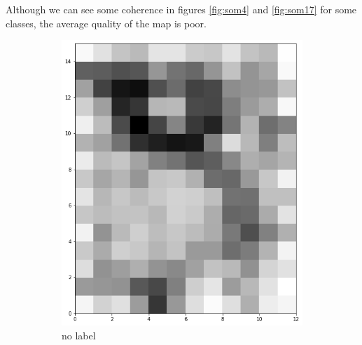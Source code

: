 \documentclass[twocolumn]{article}
\begin{document}
Although we can see some coherence in figures \ref*{fig:som4} and \ref*{fig:som17} for some classes, the average quality of the map is poor.

\begin{figure}
      \centering
      \begin{subfigure}{0.45\textwidth}
            \includegraphics[width=\textwidth]{som_unsup.png}
            \caption{no label}
            \label{fig:som_unsup}
      \end{subfigure}
      \begin{subfigure}{0.45\textwidth}
            \centering

\end{subfigure}
\end{figure}
\end{document}

